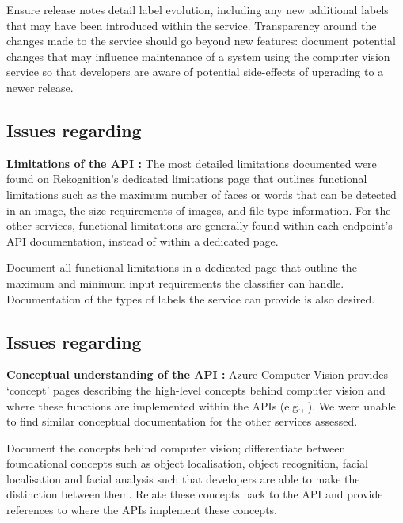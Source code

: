 \begin{leftbar}
\SuggestedImprovement
Ensure release notes detail label evolution, including any new additional labels that may have been introduced within the service. Transparency around the changes made to the service should go beyond new features: document potential changes that may influence maintenance of a system using the computer vision service so that developers are aware of potential side-effects of upgrading to a newer release.
\end{leftbar}

\subsection[Dimension B Issues]{Issues regarding \dimb{}}

\noindent
\textbf{Limitations of the API :} The most detailed limitations documented were found on Rekognition's dedicated limitations page  that outlines functional limitations such as the maximum number of faces or words that can be detected in an image, the size requirements of images, and file type information. For the other services, functional limitations are generally found within each endpoint's API documentation, instead of within a dedicated page.

\begin{leftbar}\SuggestedImprovement
Document all functional limitations in a dedicated page that outline the maximum and minimum input requirements the classifier can handle. Documentation of the types of labels the service can provide is also desired.  
\end{leftbar}


\subsection[Dimension C Issues]{Issues regarding \dimc{}}

\noindent
\textbf{Conceptual understanding of the API :} Azure Computer Vision provides `concept' pages describing the high-level concepts behind computer vision and where these functions are implemented within the APIs (e.g., ). We were unable to find similar conceptual documentation for the other services assessed.

\begin{leftbar}\SuggestedImprovement
Document the concepts behind computer vision; differentiate between foundational concepts such as object localisation, object recognition, facial localisation and facial analysis such that developers are able to make the distinction between them. Relate these concepts back to the API and provide references to where the APIs implement these concepts.
\end{leftbar}

